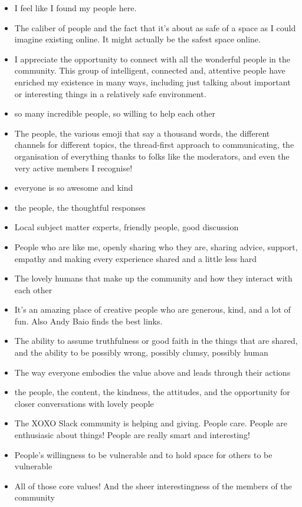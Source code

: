 \documentclass[
]{book}
\providecommand{\tightlist}{%
  \setlength{\itemsep}{0pt}\setlength{\parskip}{0pt}}
\begin{document}
\begin{itemize}
\tightlist
\item
  I feel like I found my people here.
\item
  The caliber of people and the fact that it's about as safe of a space as I could imagine existing online. It might actually be the safest space online.
\item
  I appreciate the opportunity to connect with all the wonderful people in the community. This group of intelligent, connected and, attentive people have enriched my existence in many ways, including just talking about important or interesting things in a relatively safe environment.
\item
  so many incredible people, so willing to help each other
\item
  The people, the various emoji that say a thousand words, the different channels for different topics, the thread-first approach to communicating, the organisation of everything thanks to folks like the moderators, and even the very active members I recognise!
\item
  everyone is so awesome and kind
\item
  the people, the thoughtful responses
\item
  Local subject matter experts, friendly people, good discussion
\item
  People who are like me, openly sharing who they are, sharing advice, support, empathy and making every experience shared and a little less hard
\item
  The lovely humans that make up the community and how they interact with each other
\item
  It's an amazing place of creative people who are generous, kind, and a lot of fun. Also Andy Baio finds the best links.
\item
  The ability to assume truthfulness or good faith in the things that are shared, and the ability to be possibly wrong, possibly clumsy, possibly human
\item
  The way everyone embodies the value above and leads through their actions
\item
  the people, the content, the kindness, the attitudes, and the opportunity for closer conversations with lovely people
\item
  The XOXO Slack community is helping and giving. People care. People are enthusiasic about things! People are really smart and interesting!
\item
  People's willingness to be vulnerable and to hold space for others to be vulnerable
\item
  All of those core values! And the sheer interestingness of the members of the community
\end{itemize}
\end{document}
